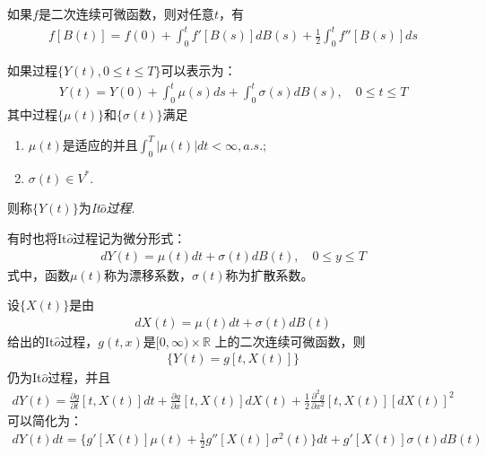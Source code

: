 \begin{theorem}\label{prop:ItoFormulaofBrownProcess}
	如果\(f\)是二次连续可微函数，则对任意\(t\)，有
	\begin{align*}
		f[B(t)]=f(0)+\int_0^tf'[B(s)]dB(s)+\frac{1}{2}\int_0^tf''[B(s)]ds
	\end{align*}
\end{theorem}

\begin{definition}\label{prop:ItoProcess(Int)}
	如果过程\(\{Y(t),0\leqslant t\leqslant T\}\)可以表示为：
	\begin{align*}
		Y(t)=Y(0)+\int_0^t\mu(s)ds+\int_0^t\sigma(s)dB(s),\quad 0\leqslant t\leqslant T
	\end{align*}
	其中过程\(\{\mu(t)\}\)和\(\{\sigma(t)\}\)满足
	\begin{enumerate}[\bfseries (1)]
		\item \(\mu(t)\)是适应的并且\(\int_0^T\lvert \mu(t)\rvert dt<\infty,a.s.\);
		\item \(\sigma(t)\in V^*\).
	\end{enumerate}
	则称\(\{Y(t)\}\)为\emph{It\(\hat{o}\)过程}.
\end{definition}

有时也将It\(\hat{o}\)过程记为微分形式：
\begin{align*}
	dY(t)=\mu(t)dt+\sigma(t)dB(t),\quad 0\leqslant y\leqslant T
\end{align*}
式中，函数\(\mu(t)\)称为漂移系数，\(\sigma(t)\)称为扩散系数。

\begin{theorem}\label{prop:ItoFormulaofItoProcess}
	设\(\{X(t)\}\)是由
	\begin{align*}
		dX(t)=\mu(t)dt+\sigma(t)dB(t)
	\end{align*}
	给出的It\(\hat{o}\)过程，\(g(t,x)\)是\([0,\infty) \times  \mathbb{R} \)
	上的二次连续可微函数，则
	\begin{align*}
		\{Y(t)=g[t,X(t)]\}
	\end{align*}
	仍为It\(\hat{o}\)过程，并且
	\begin{align*}
		dY(t)=\frac{\partial g}{\partial t}[t,X(t)]dt+\frac{\partial g}{\partial x}[t,X(t)]dX(t)
		+\frac{1}{2}\frac{\partial^2 g}{\partial x^2}[t,X(t)][dX(t)]^2
	\end{align*}
	可以简化为：
	\begin{align*}
		dY(t)dt=\{g'[X(t)]\mu(t)+\frac{1}{2}g''[X(t)]\sigma^2(t)\}dt+g'[X(t)]\sigma(t)dB(t)
	\end{align*}
\end{theorem}


